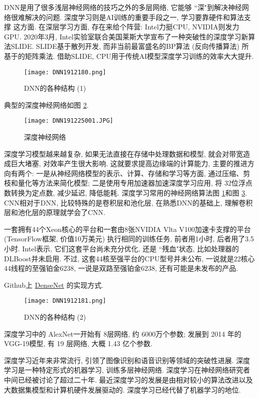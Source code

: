 DNN是用了很多浅层神经网络的技巧之外的多层网络, 它能够 ``深"到解决神经网络很难解决的问题.
深度学习则是AI训练的重要手段之一,  学习要靠硬件和算法支撑 这方面.
在深层学习方面, 存在来给个阵营: Intel力挺CPU, NVIDIA则发力 GPU.
2020年3月, Intel实验室联合美国莱斯大学宣布了一种突破性的深度学习新算法SLIDE.
SLIDE基于散列开发, 而非当前最富盛名的BP算法 (反向传播算法) 所基于的矩阵乘法.
借助SLIDE, CPU用于传统AI模型深度学习训练的效率大大提升.
\begin{figure}[H]
\centering
\texttt{[image: DNN1912180.png]}
\caption{DNN的各种结构 (1)}
\label{DNN191218121500010}
\end{figure}
典型的深度神经网络如图 \ref{DNN191225001}.
\begin{figure}[H]
    \centering
    \texttt{[image: DNN191225001.JPG]}
    \caption{深度神经网络}
    \label{DNN191225001}
\end{figure}
深度学习模型越来越复杂, 如果无法直接在存储中处理数据和模型, 就会对带宽造成巨大堵塞, 对效率产生很大影响.
这就要求提高边缘端的计算能力, 主要的推进方向有两个:
一是从神经网络模型的表示、计算、存储和学习等方面, 通过压缩、剪枝和量化等方法来简化模型;
二是使用专用加速器加速深度学习应用, 将 32位浮点数转换为定点数, 减少延迟, 降低能耗.
深度学习常用的神经网络算法图  \ref{DNN191218121500010}和图  \ref{DNN191218121500011}.
CNN相对于DNN, 比较特殊的是卷积层和池化层, 在熟悉DNN的基础上, 理解卷积层和池化层的原理就学会了CNN.

\begin{exampleT}
    一套拥有44个Xeon核心的平台和一套由8张NVIDIA Vlta V100加速卡支撑的平台 (TensorFlow框架, 价值10万美元) 执行相同的训练任务, 前者用1小时, 后者用了3.5小时.
Intel表示, 它们这套平台尚未充分优化, 还是 ``残血"状态, 比如处理器的DLBoost并未启用.
不过, 这套44核至强平台的CPU型号并未公布, 一说就是22核心44线程的至强铂金6238, 一说是双路至强铂金6238, 还有可能是未发布的产品.
\end{exampleT}
\begin{exampleT}
    Github上 \href{https://github.com/zggl/DenseNet}{DenseNet} 的实现方式.
\end{exampleT}
\begin{figure}[H]
    \centering
    \texttt{[image: DNN1912181.png]}
    \caption{DNN的各种结构 (2)}
    \label{DNN191218121500011}
    \vspace{-0.4cm}
\end{figure}
\begin{example}
    深度学习中的 AlexNet一开始有 8层网络, 约 6000万个参数; 发展到 2014 年的 VGG-19模型, 有 19 层网络, 大概 1.43 亿个参数.
\end{example}
深度学习近年来非常流行, 引领了图像识别和语音识别等领域的突破性进展.
深度学习是一种特定形式的机器学习, 训练多层神经网络.
深度学习在神经网络研究者中间已经被讨论了超过二十年.
最近深度学习的发展是由相对较小的算法改进以及大数据集模型和计算机硬件发展驱动的.
深度学习已经代替了机器学习的地位.

